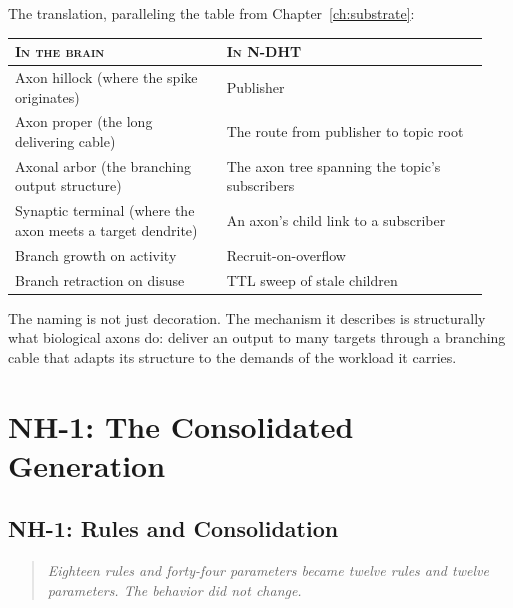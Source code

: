 \documentclass[twoside,nobib]{tufte-book}
\begin{document}
The translation, paralleling the table from Chapter~\ref{ch:substrate}:

\begin{table}[h]
\small
\begin{tabular}{@{}p{0.42\linewidth}p{0.52\linewidth}@{}}
\toprule
\textsc{In the brain} & \textsc{In N-DHT} \\
\midrule
Axon hillock (where the spike originates) & Publisher \\
Axon proper (the long delivering cable) & The route from publisher
  to topic root \\
Axonal arbor (the branching output structure) & The axon tree
  spanning the topic's subscribers \\
Synaptic terminal (where the axon meets a target dendrite) &
  An axon's child link to a subscriber \\
Branch growth on activity & Recruit-on-overflow \\
Branch retraction on disuse & TTL sweep of stale children \\
\bottomrule
\end{tabular}
\end{table}

The naming is not just decoration. The mechanism it describes is
structurally what biological axons do: deliver an output to many
targets through a branching cable that adapts its structure to
the demands of the workload it carries.


\part{NH-1: The Consolidated Generation}


\chapter{NH-1: Rules and Consolidation}
\label{ch:nh1-rules}

\begin{quote}
  \itshape Eighteen rules and forty-four parameters became twelve
  rules and twelve parameters. The behavior did not change.
\end{quote}
\end{document}
